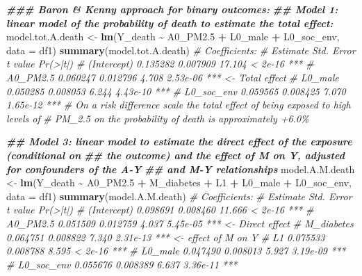 \documentclass[
]{book}
\newenvironment{Shaded}{\begin{snugshade}}{\end{snugshade}}
\newcommand{\AttributeTok}[1]{\textcolor[rgb]{0.13,0.29,0.53}{#1}}
\newcommand{\CommentTok}[1]{\textcolor[rgb]{0.56,0.35,0.01}{\textit{#1}}}
\newcommand{\DocumentationTok}[1]{\textcolor[rgb]{0.56,0.35,0.01}{\textbf{\textit{#1}}}}
\newcommand{\FloatTok}[1]{\textcolor[rgb]{0.00,0.00,0.81}{#1}}
\newcommand{\FunctionTok}[1]{\textcolor[rgb]{0.13,0.29,0.53}{\textbf{#1}}}
\newcommand{\NormalTok}[1]{#1}
\newcommand{\OtherTok}[1]{\textcolor[rgb]{0.56,0.35,0.01}{#1}}
\newcommand{\SpecialCharTok}[1]{\textcolor[rgb]{0.81,0.36,0.00}{\textbf{#1}}}
\begin{document}
\begin{Shaded}
\begin{Highlighting}[]
\DocumentationTok{\#\#\# Baron \& Kenny approach for binary outcomes:}
\DocumentationTok{\#\# Model 1: linear model of the probability of death to estimate the total effect:}
\NormalTok{model.tot.A.death }\OtherTok{\textless{}{-}} \FunctionTok{lm}\NormalTok{(Y\_death }\SpecialCharTok{\textasciitilde{}}\NormalTok{ A0\_PM2}\FloatTok{.5} \SpecialCharTok{+}\NormalTok{ L0\_male }\SpecialCharTok{+}\NormalTok{ L0\_soc\_env,}
                        \AttributeTok{data =}\NormalTok{ df1)}
\FunctionTok{summary}\NormalTok{(model.tot.A.death)}
\CommentTok{\# Coefficients:}
\CommentTok{\#               Estimate Std. Error t value Pr(\textgreater{}|t|)}
\CommentTok{\#   (Intercept) 0.135282   0.007909  17.104  \textless{} 2e{-}16 ***}
\CommentTok{\#   A0\_PM2.5    0.060247   0.012796   4.708 2.53e{-}06 *** \textless{}{-} Total effect}
\CommentTok{\#   L0\_male     0.050285   0.008053   6.244 4.43e{-}10 ***}
\CommentTok{\#   L0\_soc\_env  0.059565   0.008425   7.070 1.65e{-}12 ***}
\CommentTok{\# On a risk difference scale the total effect of being exposed to high levels of}
\CommentTok{\# PM\_2.5 on the probability of death is approximately +6.0\%}

\DocumentationTok{\#\# Model 3: linear model to estimate the direct effect of the exposure (conditional on}
\DocumentationTok{\#\# the outcome) and the effect of M on Y, adjusted for confounders of the A{-}Y}
\DocumentationTok{\#\# and M{-}Y relationships}
\NormalTok{model.A.M.death }\OtherTok{\textless{}{-}} \FunctionTok{lm}\NormalTok{(Y\_death }\SpecialCharTok{\textasciitilde{}}\NormalTok{ A0\_PM2}\FloatTok{.5} \SpecialCharTok{+}\NormalTok{ M\_diabetes }\SpecialCharTok{+}\NormalTok{ L1 }\SpecialCharTok{+}\NormalTok{ L0\_male }\SpecialCharTok{+}\NormalTok{ L0\_soc\_env,}
                      \AttributeTok{data =}\NormalTok{ df1)}
\FunctionTok{summary}\NormalTok{(model.A.M.death)}
\CommentTok{\#   Coefficients:}
\CommentTok{\#                          Estimate Std. Error t value Pr(\textgreater{}|t|)}
\CommentTok{\#   (Intercept) 0.098691   0.008460  11.666  \textless{} 2e{-}16 ***}
\CommentTok{\#   A0\_PM2.5    0.051509   0.012759   4.037 5.45e{-}05 *** \textless{}{-} Direct effect}
\CommentTok{\#   M\_diabetes  0.064751   0.008822   7.340 2.31e{-}13 *** \textless{}{-} effect of M on Y}
\CommentTok{\#   L1          0.075533   0.008788   8.595  \textless{} 2e{-}16 ***}
\CommentTok{\#   L0\_male     0.047490   0.008013   5.927 3.19e{-}09 ***}
\CommentTok{\#   L0\_soc\_env  0.055676   0.008389   6.637 3.36e{-}11 ***}



\end{Highlighting}
\end{Shaded}
\end{document}
